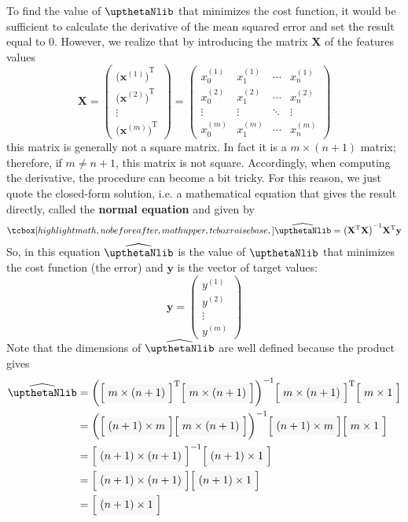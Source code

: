 To find the value of $\boldtheta$ that minimizes the cost function, it would be sufficient to calculate the derivative of the mean squared error and set the result equal to 0. However, we realize that by introducing the matrix $\mathbf{X}$ of the features values
\begin{equation}
\mathbf{X}=\begin{pmatrix}
{\bigl(\mathbf{x}^{(1)}\bigr)}^{\mathrm{T}}\\
{\bigl(\mathbf{x}^{(2)}\bigr)}^{\mathrm{T}}\\
\vdots\\
{\bigl(\mathbf{x}^{(m)}\bigr)}^{\mathrm{T}}
\end{pmatrix}=\begin{pmatrix}
x_0^{(1)} & x_1^{(1)} & \cdots & x_n^{(1)} \\
x_0^{(2)} & x_1^{(2)} & \cdots & x_n^{(2)} \\
\vdots & \vdots & \ddots & \vdots \\
x_0^{(m)} & x_1^{(m)} & \cdots & x_n^{(m)}
\end{pmatrix}
\end{equation}
this matrix is generally not a square matrix. In fact it is a $m\times(n+1)$ matrix; therefore, if $m\neq n+1$, this matrix is not square. Accordingly, when computing the derivative, the procedure can become a bit tricky. For this reason, we just quote the closed-form solution, i.e. a mathematical equation that gives the result directly, called the \textbf{normal equation} and given by
\begin{equation}
\tcbhighmath{\widehat{\boldtheta}={\bigl(\mathbf{X}^{\mathrm{T}}\mathbf{X}\bigr)}^{-1}\mathbf{X}^{\mathrm{T}}\mathbf{y}}
\end{equation}
So, in this equation $\widehat{\boldtheta}$ is the value of $\boldtheta$ that minimizes the cost function (the error) and $\mathbf{y}$ is the vector of target values:
\begin{equation}
\mathbf{y}=\begin{pmatrix}
y^{(1)} \\
y^{(2)} \\
\vdots \\
y^{(m)}
\end{pmatrix}
\end{equation}
Note that the dimensions of $\widehat{\boldtheta}$ are well defined because the product gives
\begin{equation}
\begin{split}
\widehat{\boldtheta}&={\left(\matrixbg{m\times(n+1)}^{\mathrm{T}}\matrixbg{m\times(n+1)}\right)}^{-1}\matrixbg{m\times(n+1)}^{\mathrm{T}}\matrixbg{m\times1}\\
&={\biggl(\matrixbg{(n+1)\times m}\matrixbg{m\times(n+1)}\biggr)}^{-1}\matrixbg{(n+1)\times m}\matrixbg{m\times1}\\
&=\matrixbg{(n+1)\times(n+1)}^{-1}\matrixbg{(n+1)\times 1}\\
&=\matrixbg{(n+1)\times(n+1)}\matrixbg{(n+1)\times 1}\\
&=\matrixbg{(n+1)\times 1}
\end{split}
\end{equation}

